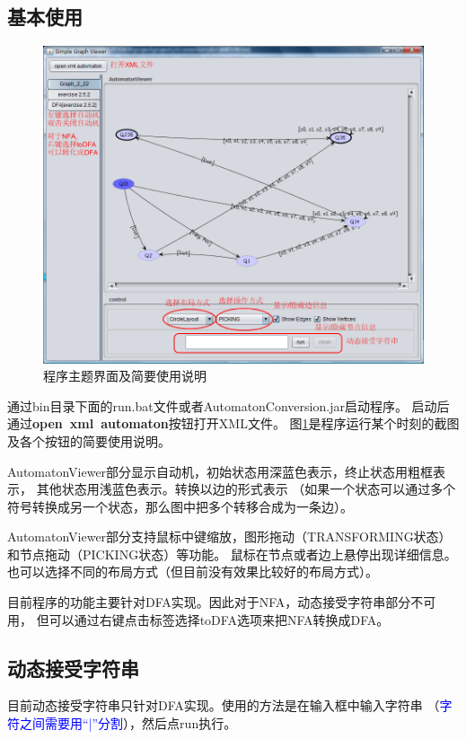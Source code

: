\documentclass[12pt,a4paper]{article}
\begin{document}
\begin{CJK}{UTF8}{song}
    \subsection{基本使用}
    \begin{figure}
    \centering
    \includegraphics[scale=.4]{full}
    \caption{程序主题界面及简要使用说明}
    \label{fig:full}
    \end{figure}

    通过bin目录下面的run.bat文件或者AutomatonConversion.jar启动程序。
    启动后通过\textbf{open~xml~automaton}按钮打开XML文件。
    图\ref{fig:full}是程序运行某个时刻的截图及各个按钮的简要使用说明。

    AutomatonViewer部分显示自动机，初始状态用深蓝色表示，终止状态用粗框表示，
    其他状态用浅蓝色表示。转换以边的形式表示
    （如果一个状态可以通过多个符号转换成另一个状态，那么图中把多个转移合成为一条边）。

    AutomatonViewer部分支持鼠标中键缩放，图形拖动（TRANSFORMING状态）和节点拖动（PICKING状态）等功能。
    鼠标在节点或者边上悬停出现详细信息。
    也可以选择不同的布局方式（但目前没有效果比较好的布局方式）。

    目前程序的功能主要针对DFA实现。因此对于NFA，动态接受字符串部分不可用，
    但可以通过右键点击标签选择toDFA选项来把NFA转换成DFA。

    \subsection{动态接受字符串}
    目前动态接受字符串只针对DFA实现。使用的方法是在输入框中输入字符串
    （\textcolor{blue}{字符之间需要用“|”分割}），然后点run执行。


\end{CJK}
\end{document}
